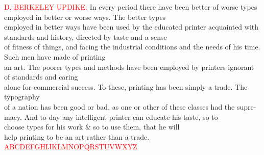 \documentclass{memoir}
\begin{document}
\noindent \normalsize \rightpointright
\tiny \textcolor{red}{\MakeUppercase{D. Berkeley
    Updike:}} In every period there have been better of worse types
employed in better or worse ways. The
better types \\
\footnotesize employed in better ways have been used by the educated printer
acquainted with standards and history, directed by taste and a
sense \\
\small of fitness of things, and facing the industrial conditions
and
the needs of his time. Such men have made of printing \\
\normalsize an art. The poorer types and methods have been employed by
printers
ignorant of standards and caring \\
\large alone for commercial success. To these, printing has been
simply a
trade. The typography \\
\Large of a nation has been good or bad, as one or other of these
classes had
the supre-\\
\LARGE macy. And to-day any intelligent printer can educate his
taste, so to \\
\huge choose types for his work \& so to use them, that he will \\
\Huge help printing to be an art rather than a
trade. \\
\textcolor{red}{ABCDEFGHIJKLMNOPQRSTUVWXYZ}
\end{document}
